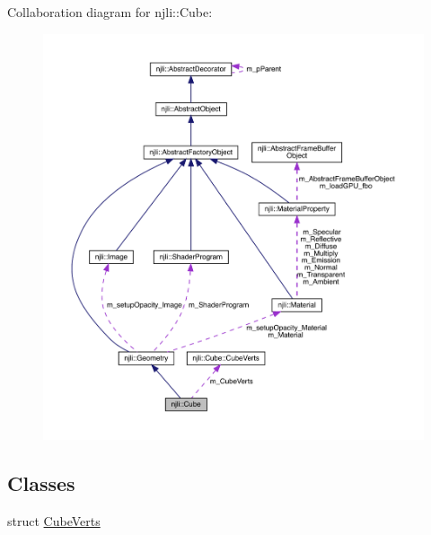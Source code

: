 Collaboration diagram for njli\+:\+:Cube\+:\nopagebreak
\begin{figure}[H]
\begin{center}
\leavevmode
\includegraphics[width=350pt]{classnjli_1_1_cube__coll__graph}
\end{center}
\end{figure}
\subsection*{Classes}
\begin{DoxyCompactItemize}
\item 
struct \mbox{\hyperlink{structnjli_1_1_cube_1_1_cube_verts}{Cube\+Verts}}
\end{DoxyCompactItemize}
